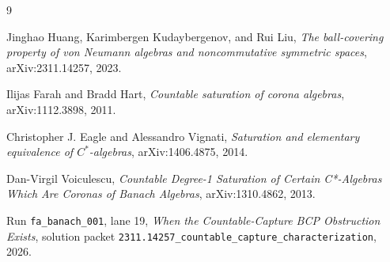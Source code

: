 \documentclass[11pt]{article}
\begin{document}
\begin{thebibliography}{9}

Jinghao Huang, Karimbergen Kudaybergenov, and Rui Liu,
\emph{The ball-covering property of von Neumann algebras and noncommutative
symmetric spaces},
arXiv:2311.14257, 2023.

Ilijas Farah and Bradd Hart,
\emph{Countable saturation of corona algebras},
arXiv:1112.3898, 2011.

Christopher J. Eagle and Alessandro Vignati,
\emph{Saturation and elementary equivalence of \(C^*\)-algebras},
arXiv:1406.4875, 2014.

Dan-Virgil Voiculescu,
\emph{Countable Degree-1 Saturation of Certain C*-Algebras Which Are Coronas
of Banach Algebras},
arXiv:1310.4862, 2013.

Run \texttt{fa\_banach\_001}, lane 19,
\emph{When the Countable-Capture BCP Obstruction Exists},
solution packet
\texttt{2311.14257\_countable\_capture\_characterization}, 2026.

\end{thebibliography}
\end{document}
